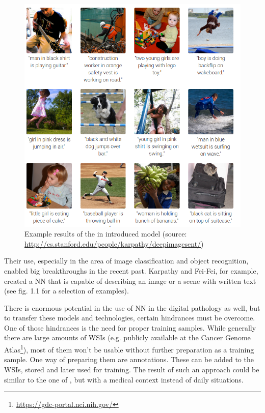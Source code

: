 \begin{figure}[ht]
	\begin{center}
		\includegraphics[scale=0.3]{img/deepVisual.png}
		\caption{Example results of the in \cite{Karpathy15} introduced model (source: \url{http://cs.stanford.edu/people/karpathy/deepimagesent/})}
		\label{fig:fig1.1}
	\end{center}
\end{figure}

Their use, especially in the area of image classification and object recognition, enabled big breakthroughs in the recent past. Karpathy and Fei-Fei, for example, created a NN that is capable of describing an image or a scene with written text\cite{Karpathy15} (see fig. 1.1 for a selection of examples).

There is enormous potential in the use of NN in the digital pathology as well, but to transfer these models and technologies, certain hindrances must be overcome. One of those hindrances is the need for proper training samples. While generally there are large amounts of WSIs (e.g. publicly available at the Cancer Genome Atlas\footnote{\url{https://gdc-portal.nci.nih.gov/}}), most of them won't be usable without further preparation as a training sample. One way of preparing them are annotations. These can be added to the WSIs, stored and later used for training. The result of such an approach could be similar to the one of \cite{Karpathy15}, but with a medical context instead of daily situations.

